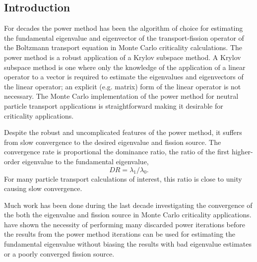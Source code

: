 \documentclass[12]{ansnse}
\begin{document}
\begin{doublespace}

\section{Introduction}
For decades\cite{Goad:1959A-Mon-0,Kaplan:1958Monte-0,Lieberoth:1968A-Mon-0,Mendelson:1968Monte-0} the power method has been the algorithm of choice for estimating the fundamental eigenvalue and eigenvector of the transport-fission operator of the Boltzmann transport equation in Monte Carlo criticality calculations.  The power method is a robust application of a Krylov subspace method.  A Krylov subspace method is one where only the knowledge of the application of a linear operator to a vector is required to estimate the eigenvalues and eigenvectors of the linear operator; an explicit (e.g. matrix) form of the linear operator is not necessary.  The Monte Carlo implementation of the power method for neutral particle transport applications is straightforward making it desirable for criticality applications.

Despite the robust and uncomplicated features of the power method, it suffers from slow convergence to the desired eigenvalue and fission source.  The convergence rate is proportional the dominance ratio, the ratio of the first higher-order eigenvalue to the fundamental eigenvalue, \[DR = \lambda_1/\lambda_0.\]  For many particle transport calculations of interest, this ratio is close to unity causing slow convergence.

Much work\cite{Brown:2009A-Rev-0} has been done during the last decade investigating the convergence of the both the eigenvalue and fission source in Monte Carlo criticality applications.  \citet{Ueki:2003Infor-0,Ueki:2005Stati-0} have shown the necessity of performing many discarded power iterations before the results from the power method iterations can be used for estimating the fundamental eigenvalue without biasing the results with bad eigenvalue estimates or a poorly converged fission source.


\end{doublespace}
\end{document}
